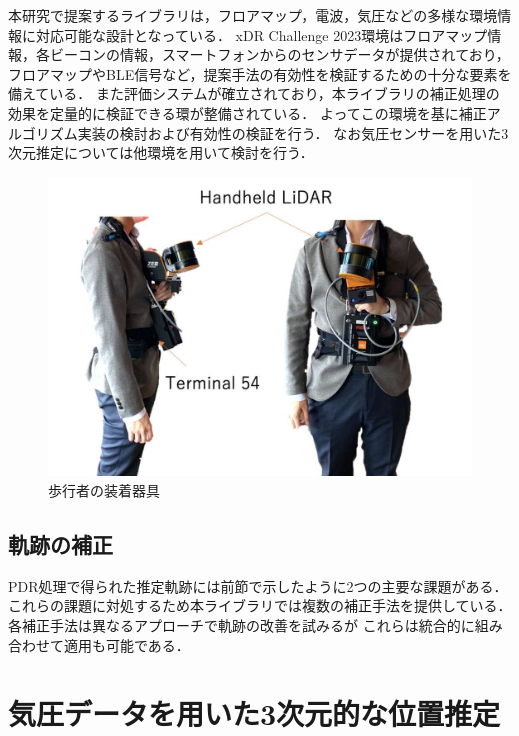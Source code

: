 本研究で提案するライブラリは，フロアマップ，電波，気圧などの多様な環境情報に対応可能な設計となっている．
xDR Challenge 2023環境はフロアマップ情報，各ビーコンの情報，スマートフォンからのセンサデータが提供されており，
フロアマップやBLE信号など，提案手法の有効性を検証するための十分な要素を備えている．
また評価システムが確立されており，本ライブラリの補正処理の効果を定量的に検証できる環が整備されている．
よってこの環境を基に補正アルゴリズム実装の検討および有効性の検証を行う．
なお気圧センサーを用いた3次元推定については他環境を用いて検討を行う．

\begin{figure}[ht]
	\centering
	\includegraphics[width=\linewidth]{../image/lidar.pdf}
	\caption{歩行者の装着器具}    \label{fig:device}
\end{figure}






\subsection{軌跡の補正}

PDR処理で得られた推定軌跡には前節で示したように2つの主要な課題がある．
これらの課題に対処するため本ライブラリでは複数の補正手法を提供している．
各補正手法は異なるアプローチで軌跡の改善を試みるが
これらは統合的に組み合わせて適用も可能である．








\section{気圧データを用いた3次元的な位置推定}



